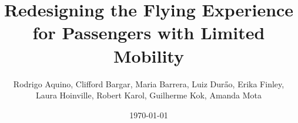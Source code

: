 \documentclass[11pt,letterpaper,oneside]{memoir}
\title{Redesigning the Flying Experience for Passengers with Limited Mobility}
\author{  
    Rodrigo Aquino, Clifford Bargar, Maria Barrera, Luiz Dur\H{a}o, Erika Finley, \\
    Laura Hoinville, Robert Karol, Guilherme Kok, Amanda Mota
    } %
\date{\today}
\begin{document}









%





  

%

\begin{appendices}
 \end{appendices}
 
\end{document}
